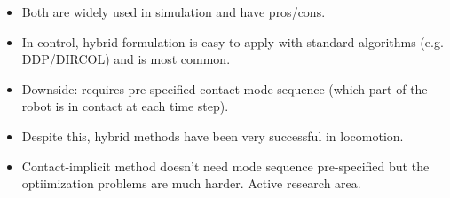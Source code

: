\begin{itemize}
    \item Both are widely used in simulation and have pros/cons.
    \item In control, hybrid formulation is easy to apply with standard algorithms (e.g. DDP/DIRCOL) and is most common.
    \item Downside: requires pre-specified contact mode sequence (which part of the robot is in contact at each time step).
    \item Despite this, hybrid methods have been very successful in locomotion.
    \item Contact-implicit method doesn't need mode sequence pre-specified but the optiimization problems are much harder. Active research area.
\end{itemize}





